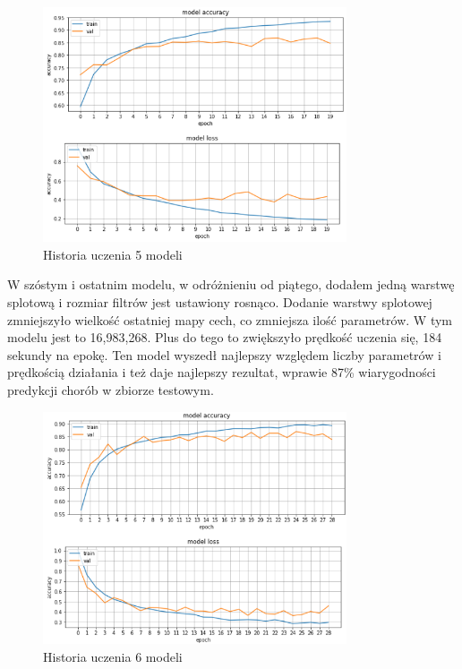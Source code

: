 \documentclass{article}
\begin{document}
\begin{figure}[H]
	\centering
	\includegraphics[width=0.8\textwidth,keepaspectratio=true]{history_5}
	\caption{Historia uczenia 5 modeli}
	\label{history_5}
\end{figure}

W szóstym i ostatnim modelu, w odróżnieniu od piątego, dodałem jedną warstwę splotową i rozmiar filtrów jest ustawiony rosnąco. Dodanie warstwy splotowej zmniejszyło wielkość ostatniej mapy cech, co zmniejsza ilość parametrów. W tym modelu jest to 16,983,268. Plus do tego to zwiększyło prędkość uczenia się, 184 sekundy na epokę. Ten model wyszedł najlepszy względem liczby parametrów i prędkością działania i też daje najlepszy rezultat, wprawie 87\% wiarygodności predykcji chorób w zbiorze testowym.  

\begin{figure}[H]
	\centering
	\includegraphics[width=0.8\textwidth,keepaspectratio=true]{history_6}
	\caption{Historia uczenia 6 modeli}
	\label{history_6}
\end{figure}
\end{document}
